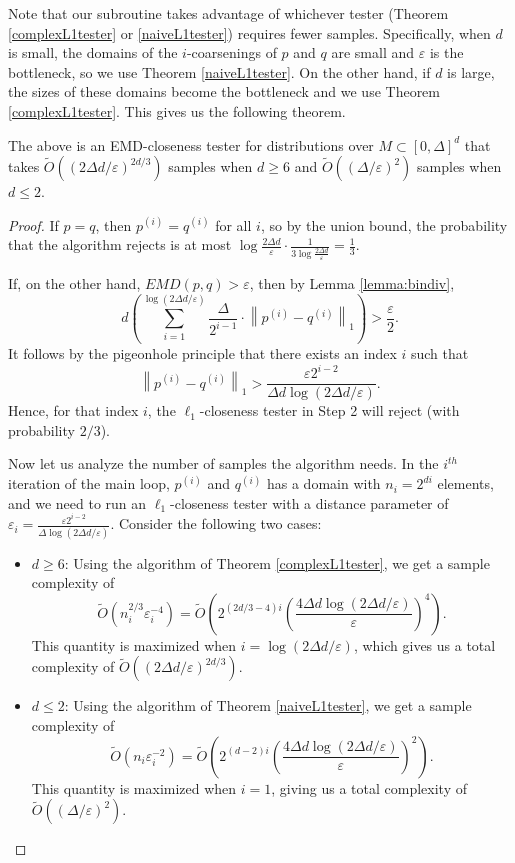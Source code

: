 \documentclass[11pt]{article}
\newcommand{\eps}{\varepsilon}
\begin{document}
Note that our subroutine takes advantage of whichever tester (Theorem \ref{complexL1tester}
or \ref{naiveL1tester}) requires fewer samples. Specifically, when $d$ is small,
the domains of the $i$-coarsenings of $p$ and $q$ are small and $\eps$ is the bottleneck,
so we use Theorem \ref{naiveL1tester}. On the other hand, if $d$ is large, the sizes of
these domains become the bottleneck and we use Theorem \ref{complexL1tester}. This gives us
the following theorem.

\begin{theorem}
  The above is an EMD-closeness tester for distributions over $M \subset [0,\Delta]^d$ that
  takes $\tilde{O}((2\Delta d/\eps)^{2d/3})$ samples when $d\geq 6$ and
  $\tilde{O}((\Delta/\eps)^{2})$ samples when $d\le2$.
\end{theorem}
\begin{proof}
  If $p=q$, then $p^{(i)}=q^{(i)}$ for all $i$, so by the union bound, the probability that
  the algorithm rejects is at most $\log{\frac{2\Delta d}{\eps}} \cdot \frac{1}{3\log\frac{2\Delta d}{\eps}} = \frac{1}{3}$. 

  If, on the other hand, $EMD(p,q) > \eps$, then by Lemma {\ref{lemma:bindiv}},
  \[
    d\left(\sum_{i=1}^{\log(2\Delta d/\eps)} \frac{\Delta}{2^{i-1}}\cdot \left\| p^{(i)} - q^{(i)}\right\|_1 \right)
    	> \frac{\eps}{2}.
  \]
  It follows by the pigeonhole principle that there exists an index $i$ such that
  \[
  	\left\| p^{(i)} - q^{(i)}\right\|_1
  		> \frac{\eps2^{i-2}}{\Delta d\log(2\Delta d/\eps)}.
  \]
  Hence, for that index $i$, the $\ell_1$-closeness tester in Step 2 will reject (with
  probability $2/3$).
  
  Now let us analyze the number of samples the algorithm needs. In the $i^{th}$ iteration of
  the main loop, $p^{(i)}$ and $q^{(i)}$ has a domain with $n_i=2^{di}$ elements, and we
  need to run an $\ell_1$-closeness tester with a distance parameter of
  $\eps_i = \frac{\eps2^{i-2}}{\Delta\log(2\Delta d/\eps)}$. Consider the following
  two cases:
  \begin{itemize}
    \item $d \geq 6$: Using the algorithm of Theorem \ref{complexL1tester}, we get a sample
    complexity of
    \[
    	\tilde{O}(n_i^{2/3}\eps_i^{-4})
    		= \tilde{O}\left(2^{(2d/3-4)i}\left(\frac{4\Delta d\log(2\Delta d/\eps)}{\eps}\right)^4\right).
    \]
    This quantity is maximized when $i = \log(2\Delta d/\eps)$, which gives us a total
    complexity of $\tilde{O}((2\Delta d/\eps)^{2d/3})$.
    
    \item $d \leq 2$: Using the algorithm of Theorem \ref{naiveL1tester}, we get a sample
    complexity of
    \[
    	\tilde{O}(n_i\eps_i^{-2})
    		= \tilde{O}\left(2^{(d-2)i}\left(\frac{4\Delta d\log(2\Delta d/\eps)}{\eps}\right)^2\right).
    \]
    This quantity is maximized when $i=1$, giving us a total complexity of
    $\tilde{O}((\Delta/\eps)^2)$.
  \end{itemize}
\end{proof}
\end{document}
